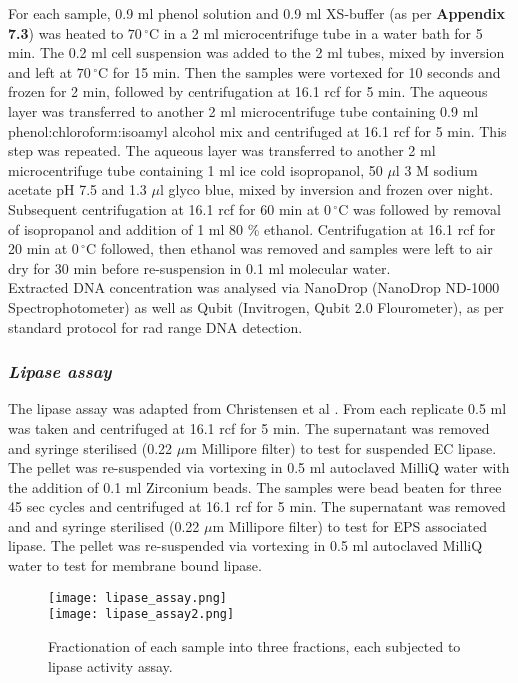 \documentclass{article}
\begin{document}
For each sample, 0.9 ml phenol solution and 0.9 ml XS-buffer (as per \textbf{Appendix 7.3}) was  heated to $70\,^{\circ}\mathrm{C}$ in a 2 ml microcentrifuge tube in a water bath for 5 min. The 0.2 ml cell suspension was added to the 2 ml tubes, mixed by inversion and left at $70\,^{\circ}\mathrm{C}$ for 15 min. Then the samples were vortexed for 10 seconds and frozen for 2 min, followed by centrifugation at 16.1 rcf for 5 min. The aqueous layer was transferred to another 2 ml microcentrifuge tube containing 0.9 ml phenol:chloroform:isoamyl alcohol mix and centrifuged at 16.1 rcf for 5 min. This step was repeated. The aqueous layer was transferred to another 2 ml microcentrifuge tube containing 1 ml ice cold isopropanol, 50 $\mu$l 3 M sodium acetate pH 7.5 and 1.3 $\mu$l glyco blue, mixed by inversion and frozen over night. Subsequent centrifugation at 16.1 rcf for 60 min at $0\,^{\circ}\mathrm{C}$ was followed by removal of isopropanol and addition of 1 ml 80 \% ethanol. Centrifugation at 16.1 rcf for 20 min at $0\,^{\circ}\mathrm{C}$ followed, then ethanol was removed and samples were left to air dry for 30 min before re-suspension in 0.1 ml molecular water.
\\ 
Extracted DNA concentration was analysed via NanoDrop (NanoDrop ND-1000 Spectrophotometer) as well as Qubit (Invitrogen, Qubit 2.0 Flourometer), as per standard protocol for rad range DNA detection.

\subsubsection{\emph{Lipase assay}}
The lipase assay was adapted from Christensen et al \cite{christensen_03}. From each replicate 0.5 ml was taken and centrifuged at 16.1 rcf for 5 min. The supernatant was removed and syringe sterilised (0.22 $\mu$m Millipore filter) to test for suspended EC lipase.
The pellet was re-suspended via vortexing in 0.5 ml autoclaved MilliQ water with the addition of 0.1 ml Zirconium beads. The samples were bead beaten for three 45 sec cycles and centrifuged at 16.1 rcf for 5 min. The supernatant was removed and and syringe sterilised (0.22 $\mu$m Millipore filter) to test for EPS associated lipase.
The pellet was re-suspended via vortexing in 0.5 ml autoclaved MilliQ water to test for membrane bound lipase.


\begin{figure}
\begin{center}
\texttt{[image: lipase\_assay.png]}\\
\texttt{[image: lipase\_assay2.png]}
\caption{Fractionation of each sample into three fractions, each subjected to lipase activity assay.}
\end{center}
\end{figure}
\end{document}
